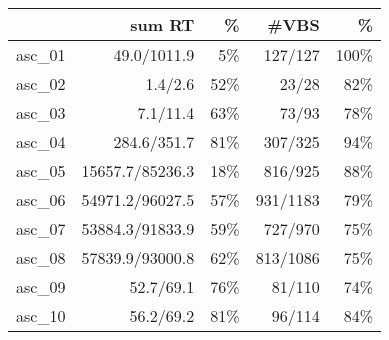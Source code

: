 \begin{tabular}{lrrrr}
\toprule
 & sum RT &  \% & #VBS & \% \\
\midrule
asc_01 & 49.0/1011.9 & 5\% & 127/127 & 100\% \\
asc_02 & 1.4/2.6 & 52\% & 23/28 & 82\% \\
asc_03 & 7.1/11.4 & 63\% & 73/93 & 78\% \\
asc_04 & 284.6/351.7 & 81\% & 307/325 & 94\% \\
asc_05 & 15657.7/85236.3 & 18\% & 816/925 & 88\% \\
asc_06 & 54971.2/96027.5 & 57\% & 931/1183 & 79\% \\
asc_07 & 53884.3/91833.9 & 59\% & 727/970 & 75\% \\
asc_08 & 57839.9/93000.8 & 62\% & 813/1086 & 75\% \\
asc_09 & 52.7/69.1 & 76\% & 81/110 & 74\% \\
asc_10 & 56.2/69.2 & 81\% & 96/114 & 84\% \\
\bottomrule
\end{tabular}

